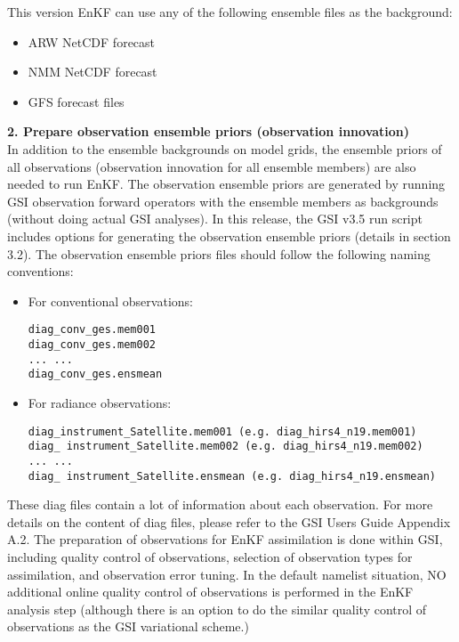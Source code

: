 This version EnKF can use any of the following ensemble files as the background:
\begin{itemize}
\item ARW NetCDF forecast
\item NMM NetCDF forecast
\item GFS forecast files
\end{itemize}

\textbf{2. Prepare observation ensemble priors (observation innovation)} \\
In addition to the ensemble backgrounds on model grids, the ensemble priors of all observations 
(observation innovation for all ensemble members) are also needed to run EnKF. The observation 
ensemble priors are generated by running GSI observation forward operators with the ensemble 
members as backgrounds (without doing actual GSI analyses). In this release, the GSI v3.5 run 
script includes options for generating the observation ensemble priors (details in section 3.2). 
The observation ensemble priors files should follow the following naming conventions:
\begin{itemize}
\item For conventional observations:
\begin{verbatim}
diag_conv_ges.mem001 
diag_conv_ges.mem002
... ...
diag_conv_ges.ensmean
\end{verbatim}
\item For radiance observations:
\begin{verbatim}
diag_instrument_Satellite.mem001 (e.g. diag_hirs4_n19.mem001) 
diag_ instrument_Satellite.mem002 (e.g. diag_hirs4_n19.mem002)
... ...
diag_ instrument_Satellite.ensmean (e.g. diag_hirs4_n19.ensmean)
\end{verbatim}
\end{itemize}

These diag files contain a lot of information about each observation. For more details on the 
content of diag files, please refer to the GSI User\textquotesingle s Guide Appendix A.2.
The preparation of observations for EnKF assimilation is done within GSI, including quality control 
of observations, selection of observation types for assimilation, and observation error tuning. In 
the default namelist situation, NO additional online quality control of observations is performed in 
the EnKF analysis step (although there is an option to do the similar quality control of observations 
as the GSI variational scheme.)

